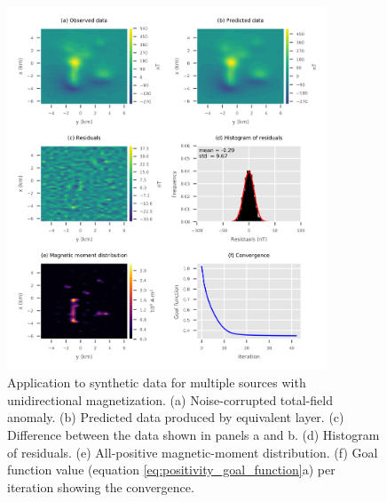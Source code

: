 \begin{figure}
	\centering
	\includegraphics[width=0.85\textwidth]{Fig/unidir_test/Fig2.png}
	\caption{Application to synthetic data for multiple sources with unidirectional magnetization. (a) Noise-corrupted total-field anomaly. (b) Predicted data produced by equivalent layer. (c) Difference between the data shown in panels a and b. (d) Histogram of residuals. (e) All-positive magnetic-moment distribution. (f) Goal function value (equation \ref{eq:positivity_goal_function}a) per iteration showing the convergence.}
	\label{fig:unidir_test}
\end{figure}

